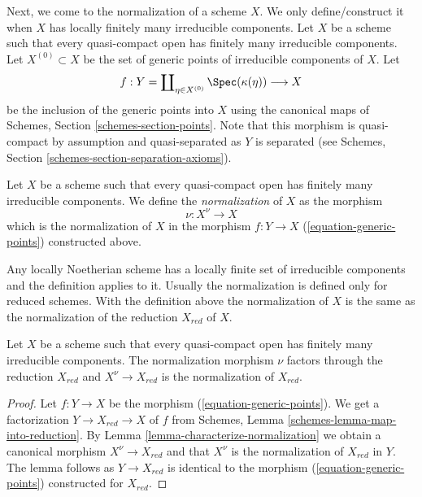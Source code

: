 \noindent
Next, we come to the normalization of a scheme $X$.
We only define/construct it when $X$ has locally finitely many irreducible
components. Let $X$ be a scheme such that every quasi-compact open has
finitely many irreducible components. Let
$X^{(0)} \subset X$ be the set of generic points of irreducible components
of $X$. Let
\begin{equation}
\label{equation-generic-points}
f :
Y = \coprod\nolimits_{\eta \in X^{(0)}} \Spec(\kappa(\eta))
\longrightarrow
X
\end{equation}
be the inclusion of the generic points into $X$ using the
canonical maps of Schemes, Section \ref{schemes-section-points}.
Note that this morphism is quasi-compact by assumption and
quasi-separated as $Y$ is separated (see
Schemes, Section \ref{schemes-section-separation-axioms}).

\begin{definition}
\label{definition-normalization}
Let $X$ be a scheme such that every quasi-compact open has
finitely many irreducible components. We define the
{\it normalization} of $X$ as the morphism
$$
\nu : X^\nu \longrightarrow X
$$
which is the normalization of $X$ in the morphism $f : Y \to X$
(\ref{equation-generic-points}) constructed above.
\end{definition}

\noindent
Any locally Noetherian scheme has a locally finite set of irreducible
components and the definition applies to it.
Usually the normalization is defined only for reduced schemes.
With the definition above the normalization of $X$ is the same
as the normalization of the reduction $X_{red}$ of $X$.

\begin{lemma}
\label{lemma-normalization-reduced}
Let $X$ be a scheme such that every quasi-compact open has
finitely many irreducible components. The normalization morphism
$\nu$ factors through the reduction $X_{red}$ and $X^\nu \to X_{red}$
is the normalization of $X_{red}$.
\end{lemma}

\begin{proof}
Let $f : Y \to X$ be the morphism (\ref{equation-generic-points}).
We get a factorization $Y \to X_{red} \to X$ of $f$ from
Schemes, Lemma \ref{schemes-lemma-map-into-reduction}.
By Lemma \ref{lemma-characterize-normalization} we obtain a canonical
morphism $X^\nu \to X_{red}$
and that $X^\nu$ is the normalization of $X_{red}$ in $Y$.
The lemma follows as $Y \to X_{red}$ is identical to the morphism
(\ref{equation-generic-points}) constructed for $X_{red}$.
\end{proof}

